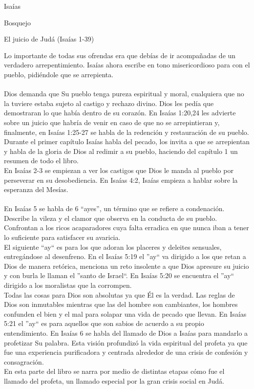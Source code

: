 \begin{section}{Isaías}
\begin{subsection}{Bosquejo}
\begin{subsubsection}{El juicio de Judá (Isaías 1-39)}
\begin{itemize}
Lo importante de todas sus ofrendas era que debías de ir acompañadas de un verdadero arrepentimiento. Isaías ahora escribe en tono misericordioso para con el pueblo, pidiéndole que se arrepienta.\\
\\
Dios demanda que Su pueblo tenga pureza espiritual y moral, cualquiera que no la tuviere estaba sujeto al castigo y rechazo divino. Dios les pedía que demostraran lo que había dentro de su corazón. En Isaías 1:20,24 les advierte sobre un juicio que habría de venir en caso de que no se arrepintieran y, finalmente, en Isaías 1:25-27 se habla de la redención y restauración de su pueblo.\\
Durante el primer capítulo Isaías habla del pecado, los invita a que se arrepientan y habla de la gloria de Dios al redimir a su pueblo, haciendo del capítulo 1 un resumen de todo el libro.\\
En Isaías 2-3 se empiezan a ver los castigos que Dios le manda al pueblo por perseverar en su desobediencia. En Isaías 4:2, Isaías empieza a hablar sobre la esperanza del Mesías.\\
\\
En Isaías 5 se habla de 6 ``ayes'', un término que se refiere a condenación. Describe la vileza y el clamor que observa en la conducta de su pueblo. Confrontan a los ricos acaparadores cuya falta erradica en que nunca iban a tener lo suficiente para satisfacer su avaricia.\\
El siguiente ``ay`` es para los que adoran  los placeres y deleites sensuales, entregándose al desenfreno. En el Isaías 5:19 el ''ay`` va dirigido a los que retan a Dios de manera retórica, menciona un reto insolente a que Dios apresure su juicio y con burla le llaman el ''santo de Israel``. En Isaías 5:20 se encuentra el ''ay`` dirigido a los moralistas que la corrompen.\\
Todas las cosas para Dios son absolutas ya que Él es la verdad. Las reglas de Dios son inmutables mientras que las del hombre son cambiantes, los hombres confunden el bien y el mal para solapar una vida de pecado que llevan. En Isaías 5:21 el ''ay`` es para aquellos que son sabios de acuerdo a su propio entendimiento.
\newpage
En Isaías 6 se habla del llamado de Dios a Isaías para mandarlo a profetizar Su palabra. Esta visión profundizó la vida espiritual del profeta ya que fue una experiencia purificadora y centrada alrededor de una crisis de confesión y consagración.\\
En esta parte del libro se narra por medio de distintas etapas cómo fue el llamado del profeta, un llamado especial por la gran crisis social en Judá.

\end{itemize}
\end{subsubsection}
\end{subsection}
\end{section}
